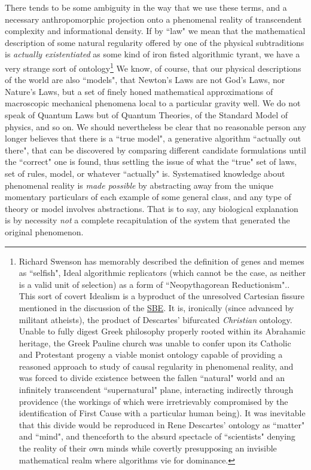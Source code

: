 There tends to be some ambiguity in the way that we use these terms, and a necessary anthropomorphic projection onto a phenomenal reality of transcendent complexity and informational density. If by ``law" we mean that the mathematical description of some natural regularity offered by one of the physical subtraditions is \textit{actually existentiated} as some kind of iron fisted algorithmic tyrant, we have a very strange sort of ontology\footnote{Richard Swenson has memorably described the definition of genes and memes as ``selfish", Ideal algorithmic replicators (which cannot be the case, as neither is a valid unit of selection) as a form of ``Neopythagorean Reductionism".\cite{Swenson1997}. This sort of covert Idealism is a byproduct of the unresolved Cartesian fissure mentioned in the discussion of the \hyperref[SBE]{SBE}. It is, ironically (since advanced by militant atheists), the product of Descartes' bifurcated \textit{Christian} ontology. Unable to fully digest Greek philosophy properly rooted within its Abrahamic heritage, the Greek Pauline church was unable to confer upon its Catholic and Protestant progeny a viable monist ontology capable of providing a reasoned approach to study of causal regularity in phenomenal reality, and was forced to divide existence between the fallen ``natural" world and an infinitely transcendent ``supernatural" plane, interacting indirectly through providence (the workings of which were irretrievably compromised by the identification of First Cause with a particular human being). It was inevitable that this divide would be reproduced in Rene Descartes' ontology as ``matter" and ``mind", and thenceforth to the absurd spectacle of ``scientists" denying the reality of their own minds while covertly presupposing an invisible mathematical realm where algorithms vie for dominance.} We know, of course, that our physical descriptions of the world are also ``models", that Newton's Laws are not God's Laws, nor Nature's Laws, but a set of finely honed mathematical approximations of macroscopic mechanical phenomena local to a particular gravity well. We do not speak of Quantum Laws but of Quantum Theories, of the Standard Model of physics, and so on. We should nevertheless be clear that no reasonable person any longer believes that there is a ``true model", a generative algorithm ``actually out there", that can be discovered by comparing different candidate formulations until the ``correct" one is found, thus settling the issue of what the ``true" set of laws, set of rules, model, or whatever ``actually" is. Systematised knowledge about phenomenal reality is \textit{made possible} by abstracting away from the unique momentary particulars of each example of some general class, and any type of theory or model involves abstractions. That is to say, any biological explanation is by necessity \textit{not} a complete recapitulation of the system that generated the original phenomenon.

